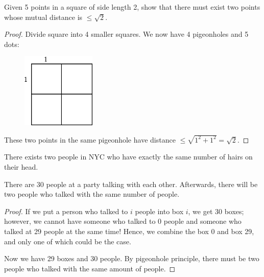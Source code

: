 \documentclass[12pt]{article}
\begin{document}
\eg Given 5 points in a square of side length 2, show that there must exist two points whose mutual distance is $\leq \sqrt{2}$.
\begin{proof}
    Divide square into 4 smaller squares. We now have 4 pigeonholes and 5 dots:
    \begin{figure}[H]
        \centering
        \includegraphics[width=100pt]{Images/image-3.png}
    \end{figure}
    These two points in the same pigeonhole have distance $\leq \sqrt{1^2+1^2}=\sqrt{2}$.
\end{proof}

\eg There exists two people in NYC who have exactly the same number of hairs on their head.

\eg There are 30 people at a party talking with each other. Afterwards, there will be two people who talked with the same number of people.
\begin{proof}
    If we put a person who talked to $i$ people into box $i$, we get 30 boxes; however, we cannot have someone who talked to 0 people and someone who talked at 29 people at the same time! Hence, we combine the box 0 and box 29, and only one of which could be the case.

    Now we have 29 boxes and 30 people. By pigeonhole principle, there must be two people who talked with the same amount of people.
\end{proof}
\end{document}
